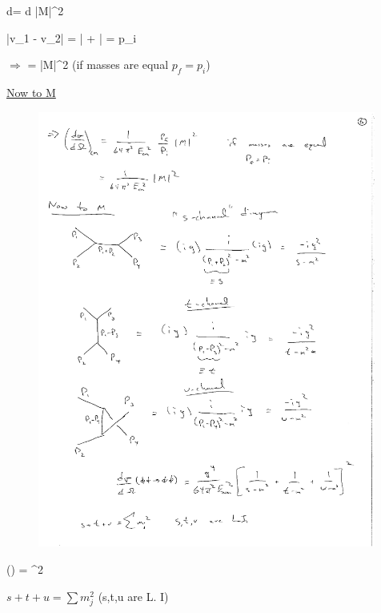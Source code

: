 {\be
d\sigma =  d\Omega {} |M|^2
\ee

\be
|v_1 - v_2| = \left|   +  \right| = p_i 
\ee


$\Rightarrow$
\be
{} =    |M|^2
\ee
(if masses are equal $p_f = p_i$)

\clearpage
\underline{Now to M}

\begin{figure}[h]
\centering
\includegraphics[width=0.99\textwidth]{./STUDiagrams.pdf}
\end{figure}

\be
{}(\phi\phi\rightarrow\phi\phi) =  ^2
\ee


$s+t+u = \sum m_j^2$  (s,t,u are L. I)

\clearpage

}
